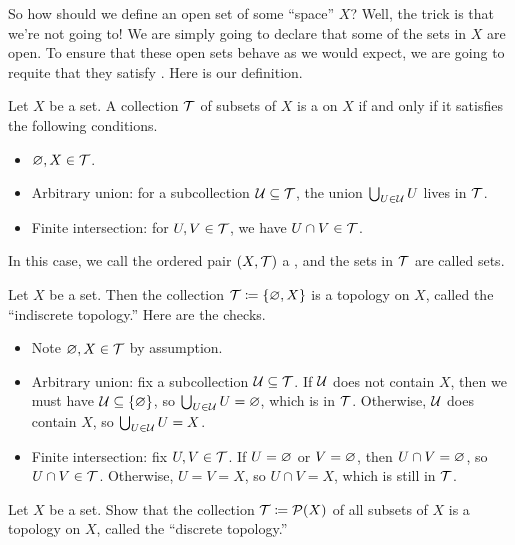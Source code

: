\documentclass[../main.tex]{subfiles}
\begin{document}
So how should we define an open set of some ``space'' $X$? Well, the trick is that we're not going to! We are simply going to declare that some of the sets in $X$ are open. To ensure that these open sets behave as we would expect, we are going to requite that they satisfy . Here is our definition.
\begin{definition}[topology]
    Let $X$ be a set. A collection $\mathcal{T}$ of subsets of $X$ is a  on $X$ if and only if it satisfies the following conditions.
    \begin{itemize}
        \item $\varnothing,X\in\mathcal{T}$.
        \item Arbitrary union: for a subcollection $\mathcal{U}\subseteq\mathcal{T}$, the union $\bigcup_{U\in\mathcal{U}}U$ lives in $\mathcal{T}$.
        \item Finite intersection: for $U,V\in\mathcal{T}$, we have $U\cap V\in\mathcal{T}$.
    \end{itemize}
    In this case, we call the ordered pair $(X,\mathcal{T})$ a , and the sets in $\mathcal{T}$ are called  sets.
\end{definition}
\begin{example} \label{ex:indiscrete-top}
    Let $X$ be a set. Then the collection $\mathcal{T}\coloneqq\{\varnothing,X\}$ is a topology on $X$, called the ``indiscrete topology.'' Here are the checks.
    \begin{itemize}
        \item Note $\varnothing,X\in\mathcal{T}$ by assumption.
        \item Arbitrary union: fix a subcollection $\mathcal{U}\subseteq\mathcal{T}$. If $\mathcal{U}$ does not contain $X$, then we must have $\mathcal{U}\subseteq\{\varnothing\}$, so $\bigcup_{U\in\mathcal{U}}U=\varnothing$, which is in $\mathcal{T}$. Otherwise, $\mathcal{U}$ does contain $X$, so $\bigcup_{U\in\mathcal{U}}U=X$.
        \item Finite intersection: fix $U,V\in\mathcal{T}$. If $U=\varnothing$ or $V=\varnothing$, then $U\cap V=\varnothing$, so $U\cap V\in\mathcal{T}$. Otherwise, $U=V=X$, so $U\cap V=X$, which is still in $\mathcal{T}$.
    \end{itemize}
\end{example}
\begin{exe} \label{ex:discrete-top}
    Let $X$ be a set. Show that the collection $\mathcal{T}\coloneqq\mathcal{P}(X)$ of all subsets of $X$ is a topology on $X$, called the ``discrete topology.''
\end{exe}
\end{document}

